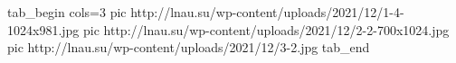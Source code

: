  
 
 
 
 

\ifcmt
  tab_begin cols=3
     pic http://lnau.su/wp-content/uploads/2021/12/1-4-1024x981.jpg
     pic http://lnau.su/wp-content/uploads/2021/12/2-2-700x1024.jpg
		 pic http://lnau.su/wp-content/uploads/2021/12/3-2.jpg
  tab_end
\fi
